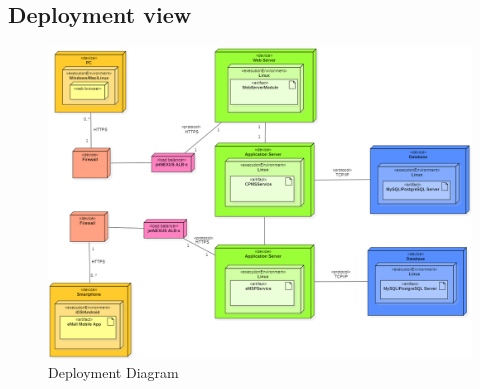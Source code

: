 \subsection{Deployment view}

\begin{figure}[H]
    \begin{center}
        \includegraphics[width=\textwidth]{img/DeploymentDiagram.PNG}
        \caption{Deployment Diagram}\label{deployment_diagram}
    \end{center}
\end{figure}

